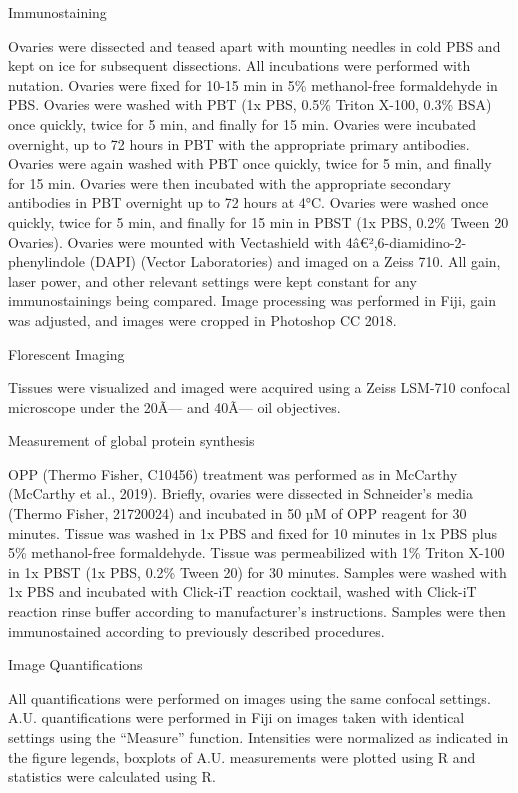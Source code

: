 \documentclass[12pt,twoside]{reedthesis}
\begin{document}
{Immunostaining}

Ovaries were dissected and teased apart with mounting needles in cold
PBS and kept on ice for subsequent dissections. All incubations were
performed with nutation. Ovaries were fixed for 10-15 min in 5\%
methanol-free formaldehyde in PBS. Ovaries were washed with PBT (1x PBS,
0.5\% Triton X-100, 0.3\% BSA) once quickly, twice for 5 min, and finally
for 15 min. Ovaries were incubated overnight, up to 72 hours in PBT with
the appropriate primary antibodies. Ovaries were again washed with PBT
once quickly, twice for 5 min, and finally for 15 min. Ovaries were then
incubated with the appropriate secondary antibodies in PBT overnight up
to 72 hours at 4°C. Ovaries were washed once quickly, twice for 5 min,
and finally for 15 min in PBST (1x PBS, 0.2\% Tween 20 Ovaries). Ovaries
were mounted with Vectashield with 4â€²,6-diamidino-2-phenylindole (DAPI)
(Vector Laboratories) and imaged on a Zeiss 710. All gain, laser power,
and other relevant settings were kept constant for any immunostainings
being compared. Image processing was performed in Fiji, gain was
adjusted, and images were cropped in Photoshop CC 2018.

{Florescent Imaging}

Tissues were visualized and imaged were acquired using a Zeiss LSM-710
confocal microscope under the 20Ã--- and 40Ã--- oil objectives.

{Measurement of global protein synthesis}

OPP (Thermo Fisher, C10456) treatment was performed as in McCarthy
(McCarthy et al., 2019). Briefly, ovaries were
dissected in Schneider's media (Thermo Fisher, 21720024) and incubated
in 50 µM of OPP reagent for 30 minutes. Tissue was washed in 1x PBS and
fixed for 10 minutes in 1x PBS plus 5\% methanol-free formaldehyde.
Tissue was permeabilized with 1\% Triton X-100 in 1x PBST (1x PBS, 0.2\%
Tween 20) for 30 minutes. Samples were washed with 1x PBS and incubated
with Click-iT reaction cocktail, washed with Click-iT reaction rinse
buffer according to manufacturer's instructions. Samples were then
immunostained according to previously described procedures.

{Image Quantifications}

All quantifications were performed on images using the same confocal
settings. A.U. quantifications were performed in Fiji on images taken
with identical settings using the ``Measure'' function. Intensities were
normalized as indicated in the figure legends, boxplots of A.U.
measurements were plotted using R and statistics were calculated using
R.
\end{document}
